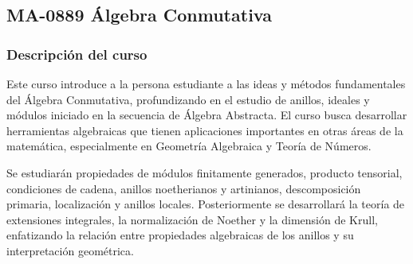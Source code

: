 \newpage
\subsection*{MA-0889 Álgebra Conmutativa}
\hypertarget{MA0889}{}

\begin{refsection}
\begin{table}[H]
\end{table}


\subsubsection*{Descripción del curso}

Este curso introduce a la persona estudiante a las ideas y métodos fundamentales del Álgebra Conmutativa, profundizando en el estudio de anillos, ideales y módulos iniciado en la secuencia de Álgebra Abstracta. El curso busca desarrollar herramientas algebraicas que tienen aplicaciones importantes en otras áreas de la matemática, especialmente en Geometría Algebraica y Teoría de Números.

Se estudiarán propiedades de módulos finitamente generados, producto tensorial, condiciones de cadena, anillos noetherianos y artinianos, descomposición primaria, localización y anillos locales. Posteriormente se desarrollará la teoría de extensiones integrales, la normalización de Noether y la dimensión de Krull, enfatizando la relación entre propiedades algebraicas de los anillos y su interpretación geométrica.


\end{refsection}
